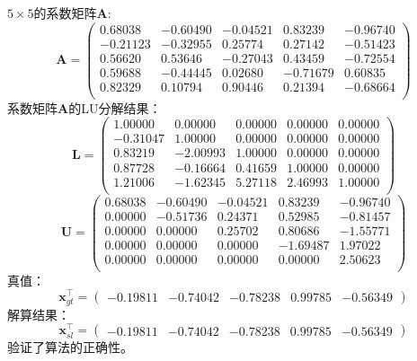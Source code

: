 \documentclass[12pt, onecolumn]{article}
\newcommand\normf{\fangsong}
\begin{document}
	\subsubsection{\normf{小型随机矩阵测试}}
	$5\times 5$的系数矩阵$\boldsymbol{A}$:
	\begin{equation}
	\boldsymbol{A}=\begin{pmatrix}
	 0.68038 &-0.60490 &-0.04521&  0.83239& -0.96740\\
	-0.21123 &-0.32955 & 0.25774&  0.27142& -0.51423\\
	 0.56620 & 0.53646 &-0.27043&  0.43459& -0.72554\\
	 0.59688 &-0.44445 & 0.02680& -0.71679&  0.60835\\
	 0.82329 & 0.10794 & 0.90446&  0.21394& -0.68664\\
	\end{pmatrix}
	\end{equation}
	系数矩阵$\boldsymbol{A}$的LU分解结果：
	\begin{equation}
	\boldsymbol{L}=\begin{pmatrix}
	 1.00000&  0.00000&  0.00000&  0.00000 & 0.00000\\
	-0.31047&  1.00000&  0.00000&  0.00000 & 0.00000\\
	 0.83219& -2.00993&  1.00000&  0.00000 & 0.00000\\
	 0.87728& -0.16664&  0.41659&  1.00000 & 0.00000\\
	 1.21006& -1.62345&  5.27118&  2.46993 & 1.00000\\
	\end{pmatrix}
	\end{equation}
	\begin{equation}
	\boldsymbol{U}=\begin{pmatrix}
	 0.68038& -0.60490& -0.04521 & 0.83239& -0.96740\\
	 0.00000& -0.51736&  0.24371 & 0.52985& -0.81457\\
	 0.00000&  0.00000&  0.25702 & 0.80686& -1.55771\\
	 0.00000&  0.00000&  0.00000 &-1.69487&  1.97022\\
	 0.00000&  0.00000&  0.00000 & 0.00000&  2.50623\\
	\end{pmatrix}
	\end{equation}
	真值：
	\begin{equation}
	\boldsymbol{x}_{gt}^\top=\begin{pmatrix}
	-0.19811 &-0.74042& -0.78238 & 0.99785& -0.56349
	\end{pmatrix}
	\end{equation}
	解算结果：
	\begin{equation}
	\boldsymbol{x}_{sl}^\top=\begin{pmatrix}
	-0.19811 &-0.74042& -0.78238 & 0.99785& -0.56349
	\end{pmatrix}
	\end{equation}
	验证了算法的正确性。
	
\end{document}
